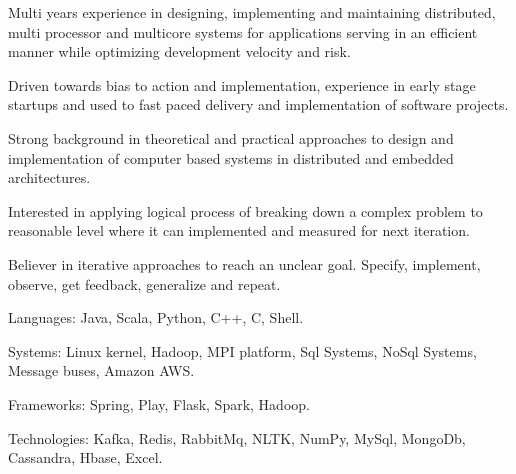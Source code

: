 

\begin{cventries}

\cventryOnlyDescription
      {\begin{cvitems} %
        \item {Multi years experience in designing, implementing and maintaining distributed, multi processor and multicore systems for applications serving in an efficient manner while optimizing development velocity and risk.}
	\item {Driven towards bias to action and implementation, experience in early stage startups and used to fast paced delivery and implementation of software projects.}
        \item {Strong background in theoretical and practical approaches to design and implementation of computer based systems in distributed and embedded architectures.}
	\item{Interested in applying logical process of breaking down a complex problem to reasonable level where it can implemented and measured for next iteration.}
	\item {Believer in iterative approaches to reach an unclear goal. Specify, implement, observe, get feedback, generalize and repeat.}
	\item {Languages: Java, Scala, Python, C++, C, Shell.}
	\item {Systems: Linux kernel, Hadoop, MPI platform, Sql Systems, NoSql Systems, Message buses, Amazon AWS.}
	\item {Frameworks: Spring, Play, Flask, Spark, Hadoop.}
	\item {Technologies: Kafka, Redis, RabbitMq, NLTK, NumPy, MySql, MongoDb, Cassandra, Hbase, Excel.}
       \end{cvitems}
      }
\end{cventries}
